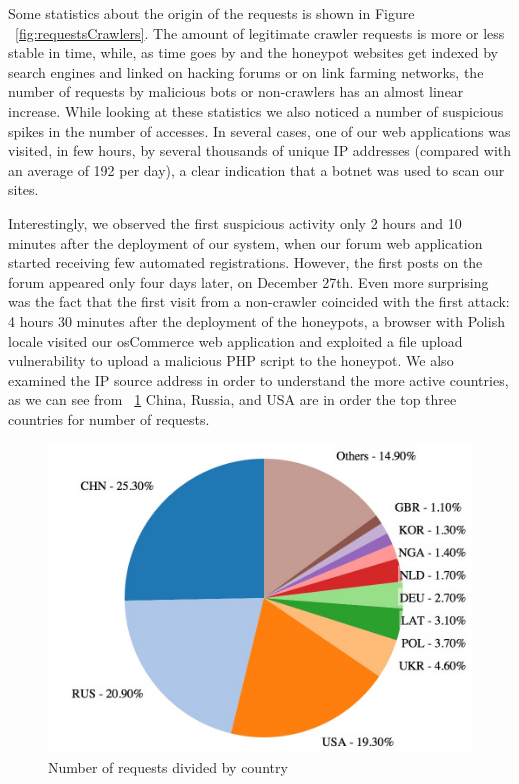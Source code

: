 Some statistics about the origin of the requests is shown in Figure ~\ref{fig:requestsCrawlers}. The amount of legitimate crawler requests is more or less stable in time, while, as time goes by and the honeypot websites get indexed by search engines and linked on hacking forums or on link farming networks, the number of requests by malicious bots or non-crawlers has an almost linear increase.
While looking at these statistics we also noticed a number of suspicious spikes in the number of accesses. In several cases, one of our web applications was visited, in few hours, by several thousands of unique IP addresses (compared with an average of 192 per day), a clear indication that a botnet was used to scan our sites.

Interestingly, we observed the first suspicious activity only 2 hours and 10 minutes after the deployment of our system, when our forum web application started receiving few automated registrations. However, the first posts on the forum appeared only four days later, on December 27th. Even more surprising was the fact that the first visit from a non-crawler coincided with the first attack: 4 hours 30 minutes after the deployment of the honeypots, a browser with Polish locale visited our osCommerce web application and exploited a file upload vulnerability to upload a malicious PHP script to the honeypot. We also examined the IP source address in order to understand the more active countries, as we can see from ~\ref{fig:requests_countries} China, Russia, and USA are in order the top three countries for number of requests.

\begin{figure}[tbh]
\centerline{\includegraphics[scale=0.7]{Images/requests_countries.jpg}}
\caption{Number of requests divided by country\label{fig:requests_countries}}
\end{figure}

